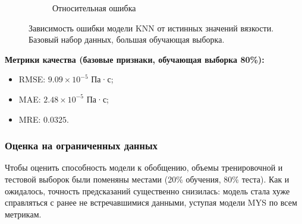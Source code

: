 \documentclass[a4paper,12pt]{article}
\begin{document}
\begin{figure}[ht!]
\begin{subfigure}{0.48\textwidth}
            \caption{Относительная ошибка}
        \end{subfigure}
        \caption{Зависимость ошибки модели KNN от истинных значений вязкости. Базовый набор данных, большая обучающая выборка.}
        \label{fig:knn_errors_02_base}
      \end{figure}
      
    \vspace{5mm}
      \begin{minipage}{\textwidth}
        \textbf{Метрики качества (базовые признаки, обучающая выборка 80\%):}
        \begin{itemize}
          \item RMSE: \( 9.09 \times 10^{-5} \) Па·с;
          \item MAE: \( 2.48 \times 10^{-5} \) Па·с;
          \item MRE: \( 0.0325 \).
        \end{itemize}
      \end{minipage}

    \subsubsection{Оценка на ограниченных данных}

      Чтобы оценить способность модели к обобщению, объемы тренировочной и тестовой выборок были поменяны местами (20\% обучения, 80\% теста). Как и ожидалось, точность предсказаний существенно снизилась: модель стала хуже справляться с ранее не встречавшимися данными, уступая модели MYS по всем метрикам.
      
\end{document}

